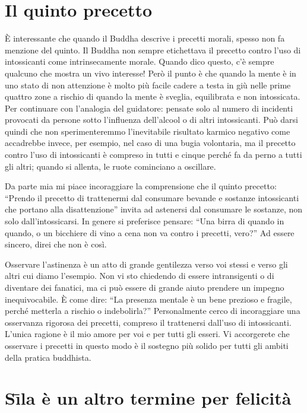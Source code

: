 \section*{Il quinto precetto}

\vspace*{-0.8em}
È interessante che quando il Buddha descrive i precetti morali, spesso non fa menzione del quinto. Il Buddha non sempre etichettava il precetto contro l'uso di intossicanti come intrinsecamente morale. Quando dico questo, c'è sempre qualcuno che mostra un vivo interesse! Però il punto è che quando la mente è in uno stato di non attenzione è molto più facile cadere a testa in giù nelle prime quattro zone a rischio di quando la mente è sveglia, equilibrata e non intossicata. Per continuare con l'analogia del guidatore: pensate solo al numero di incidenti provocati da persone sotto l'influenza dell'alcool o di altri intossicanti. Può darsi quindi che non sperimenteremmo l'inevitabile risultato karmico negativo come accadrebbe invece, per esempio, nel caso di una bugia volontaria, ma il precetto contro l'uso di intossicanti è compreso in tutti e cinque perché fa da perno a tutti gli altri; quando si allenta, le ruote cominciano a oscillare.

Da parte mia mi piace incoraggiare la comprensione che il quinto precetto: ``Prendo il precetto di trattenermi dal consumare bevande e sostanze intossicanti che portano alla disattenzione'' invita ad astenersi dal consumare le sostanze, non solo dall'intossicarsi. In genere si preferisce pensare: ``Una birra di quando in quando, o un bicchiere di vino a cena non va contro i precetti, vero?'' Ad essere sincero, direi che non è così.

Osservare l'astinenza è un atto di grande gentilezza verso voi stessi e verso gli altri cui diamo l'esempio. Non vi sto chiedendo di essere intransigenti o di diventare dei fanatici, ma ci può essere di grande aiuto prendere un impegno inequivocabile. È come dire: ``La presenza mentale è un bene prezioso e fragile, perché metterla a rischio o indebolirla?'' Personalmente cerco di incoraggiare una osservanza rigorosa dei precetti, compreso il trattenersi dall'uso di intossicanti. L'unica ragione è il mio amore per voi e per tutti gli esseri. Vi accorgerete che osservare i precetti in questo modo è il sostegno più solido per tutti gli ambiti della pratica buddhista.

\vspace*{-0.8em}
\section*{S\={\i}la \`e un altro termine per felicit\`a}

